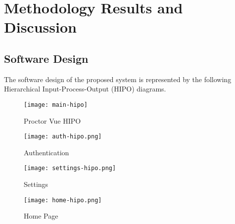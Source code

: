 \chapter{Methodology Results and Discussion}


\section{Software Design}

The software design of the proposed system is represented by the following Hierarchical Input-Process-Output (HIPO) diagrams.

\vspace{1cm}

\begin{figure}[h!]
    \begin{center}
        \texttt{[image: main-hipo]}
        \caption{Proctor Vue HIPO}
    \end{center}
\end{figure}

\vspace{1cm}

\begin{figure}[h!]
    \begin{center}
        \texttt{[image: auth-hipo.png]}
        \caption{Authentication}
    \end{center}
\end{figure}

\vspace{1cm}

\begin{figure}[h!]
    \begin{center}
        \texttt{[image: settings-hipo.png]}
        \caption{Settings}
    \end{center}
\end{figure}

\vspace{1cm}

\begin{figure}[h!]
    \begin{center}
        \texttt{[image: home-hipo.png]}
        \caption{Home Page}
    \end{center}
\end{figure}

